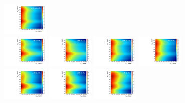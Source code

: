\begin{figure}[htbp]
  \includegraphics[width=0.2\textwidth]{fig/analysis/template_res_e_LP_nobb_LDy.pdf}\\
  \includegraphics[width=0.2\textwidth]{fig/analysis/template_res_mu_HP_vbf_LDy.pdf}
  \includegraphics[width=0.2\textwidth]{fig/analysis/template_res_e_HP_vbf_LDy.pdf}
  \includegraphics[width=0.2\textwidth]{fig/analysis/template_res_mu_LP_vbf_LDy.pdf}
  \includegraphics[width=0.2\textwidth]{fig/analysis/template_res_e_LP_vbf_LDy.pdf}\\
  \includegraphics[width=0.2\textwidth]{fig/analysis/template_res_mu_HP_bb_HDy.pdf}
  \includegraphics[width=0.2\textwidth]{fig/analysis/template_res_e_HP_bb_HDy.pdf}
  \includegraphics[width=0.2\textwidth]{fig/analysis/template_res_mu_LP_bb_HDy.pdf}

\end{figure}
